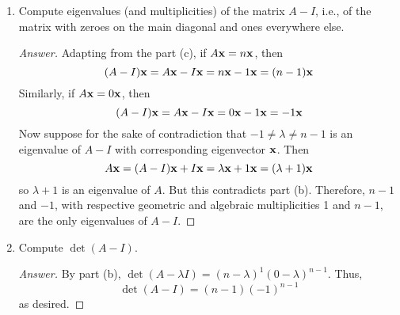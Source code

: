 \documentclass[../psets.tex]{subfiles}
\begin{document}
\begin{enumerate}[label={\textbf{3.\arabic*.}}]
\begin{enumerate}
\begin{proof}[Answer]
            \begin{equation*}
                A\x = nP_\vm\x = n\cdot 1\x = n\x
            \end{equation*}
            for all $\x\in\spn\{\vm\}$ and that
            \begin{equation*}
                A\x = nP_\vm\x = n\cdot 0\x = 0\x
            \end{equation*}
            for all $\x\in\spn\{\vm\}^\perp$. Therefore, the eigenvalues of $A$ are $n$ and 0, with respective geometric and algebraic multiplicities 1 and $n-1$.
        \end{proof}
        \item Compute eigenvalues (and multiplicities) of the matrix $A-I$, i.e., of the matrix with zeroes on the main diagonal and ones everywhere else.
        \begin{proof}[Answer]
            Adapting from the part (c), if $A\mathbf{x}=n\mathbf{x}$, then
            \begin{equation*}
                (A-I)\mathbf{x} = A\mathbf{x}-I\mathbf{x} = n\mathbf{x}-1\mathbf{x} = (n-1)\mathbf{x}
            \end{equation*}
            Similarly, if $A\mathbf{x}=0\mathbf{x}$, then
            \begin{equation*}
                (A-I)\mathbf{x} = A\mathbf{x}-I\mathbf{x} = 0\mathbf{x}-1\mathbf{x} = -1\mathbf{x}
            \end{equation*}
            Now suppose for the sake of contradiction that $-1\neq\lambda\neq n-1$ is an eigenvalue of $A-I$ with corresponding eigenvector $\mathbf{x}$. Then
            \begin{equation*}
                A\mathbf{x} = (A-I)\mathbf{x}+I\mathbf{x} = \lambda\mathbf{x}+1\mathbf{x} = (\lambda+1)\mathbf{x}
            \end{equation*}
            so $\lambda+1$ is an eigenvalue of $A$. But this contradicts part (b). Therefore, $n-1$ and $-1$, with respective geometric and algebraic multiplicities 1 and $n-1$, are the only eigenvalues of $A-I$.
        \end{proof}
        \item Compute $\det(A-I)$.
        \begin{proof}[Answer]
            By part (b), $\det(A-\lambda I)=(n-\lambda)^1(0-\lambda)^{n-1}$. Thus,
            \begin{equation*}
                \det(A-I) = (n-1)(-1)^{n-1}
            \end{equation*}
            as desired.
        \end{proof}
    \end{enumerate}

\end{enumerate}
\end{document}
